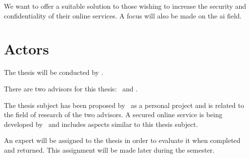 We want to offer a suitable solution to those wishing to increase the security and confidentiality of their online services. A focus will also be made on the \gls{ai} field.

\section{Actors}
\label{sec:context_actors}

The thesis will be conducted by \Author.

There are two advisors for this thesis: \AdvisorOne \ and \AdvisorTwo. 

The thesis subject has been proposed by \Author \ as a personal project and is related to the field of research of the two advisors. A secured online service is being developed by \AdvisorOne \ and includes aspects similar to this thesis subject.

An expert will be assigned to the thesis in order to evaluate it when completed and returned. This assignment will be made later during the semester.